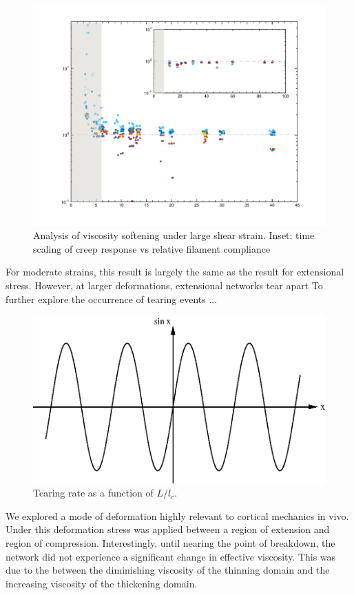 \documentclass[pre,preprint]{revtex4-1}
\begin{document}
\begin{figure}[h!]
\centering
\includegraphics[width=\hsize]{eff_vic_master}
\caption{\label{fig:align}Analysis of viscosity softening under large shear strain. Inset: time scaling of creep response vs relative filament compliance  }
\end{figure}

For moderate strains, this result is largely the same as the result for extensional stress.  However, at larger deformations, extensional networks tear apart
To further explore the occurrence of tearing events ...

\begin{figure}[h!]
\centering
\includegraphics[scale=0.6]{sine}
\caption{\label{fig:tear}Tearing rate as a function of $L/l_c$.}
\end{figure}

We explored a mode of deformation highly relevant to cortical mechanics in vivo.  Under this deformation stress was applied between a region of extension and region of compression.  Interestingly, until nearing the point of breakdown, the network did not experience a significant change in effective viscosity.  This was due to the between the diminishing viscosity of the thinning domain and the increasing viscosity of the thickening domain.  
\end{document}
